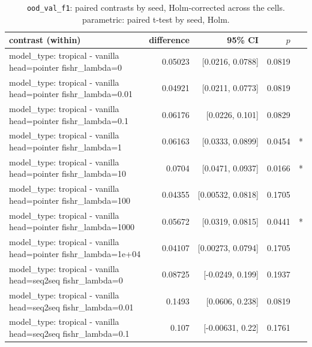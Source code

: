 \documentclass[10pt]{article}
\makeatletter
\newcommand{\stackcell}[1]{\begin{tabular}[t]{@{}l@{}}#1\end{tabular}}
\makeatother
\begin{document}
{\small
\begin{longtable}{lrrrl}
\caption{\texttt{ood\_val\_f1}: paired contrasts by seed, Holm-corrected across the cells. parametric: paired t-test by seed, Holm.}\label{tab:paired-ood_val_f1}\\
\toprule
contrast (within) & difference & 95\% CI & $p$ & \\
\midrule
\endhead
\stackcell{model\_type: tropical - vanilla\\\footnotesize head=pointer fishr\_lambda=0 } & 0.05023 & [0.0216, 0.0788] & 0.0819 & \\
\stackcell{model\_type: tropical - vanilla\\\footnotesize head=pointer fishr\_lambda=0.01 } & 0.04921 & [0.0211, 0.0773] & 0.0819 & \\
\stackcell{model\_type: tropical - vanilla\\\footnotesize head=pointer fishr\_lambda=0.1 } & 0.06176 & [0.0226, 0.101] & 0.0829 & \\
\stackcell{model\_type: tropical - vanilla\\\footnotesize head=pointer fishr\_lambda=1 } & 0.06163 & [0.0333, 0.0899] & 0.0454 & *\\
\stackcell{model\_type: tropical - vanilla\\\footnotesize head=pointer fishr\_lambda=10 } & 0.0704 & [0.0471, 0.0937] & 0.0166 & *\\
\stackcell{model\_type: tropical - vanilla\\\footnotesize head=pointer fishr\_lambda=100 } & 0.04355 & [0.00532, 0.0818] & 0.1705 & \\
\stackcell{model\_type: tropical - vanilla\\\footnotesize head=pointer fishr\_lambda=1000 } & 0.05672 & [0.0319, 0.0815] & 0.0441 & *\\
\stackcell{model\_type: tropical - vanilla\\\footnotesize head=pointer fishr\_lambda=1e+04 } & 0.04107 & [0.00273, 0.0794] & 0.1705 & \\
\stackcell{model\_type: tropical - vanilla\\\footnotesize head=seq2seq fishr\_lambda=0 } & 0.08725 & [-0.0249, 0.199] & 0.1937 & \\
\stackcell{model\_type: tropical - vanilla\\\footnotesize head=seq2seq fishr\_lambda=0.01 } & 0.1493 & [0.0606, 0.238] & 0.0819 & \\
\stackcell{model\_type: tropical - vanilla\\\footnotesize head=seq2seq fishr\_lambda=0.1 } & 0.107 & [-0.00631, 0.22] & 0.1761 & \\

\end{longtable}}
\end{document}
